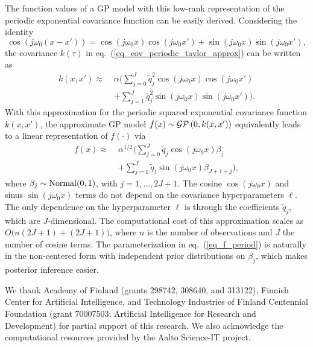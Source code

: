 The function values of a GP model with this low-rank representation of the periodic exponential covariance function can be easily derived. Considering the identity
%
\begin{equation*}
\cos(j\omega_0 (x-x'))=\cos(j\omega_0 x) \cos(j\omega_0 x') + \sin(j\omega_0 x) \sin(j\omega_0 x'),
\end{equation*}
the covariance $k(\tau)$ in eq.~(\ref{eq_cov_periodic_taylor_approx}) can be written as
%
\begin{align} \label{eq_cov_periodic_taylor_approx_2}
k(x,x')\approx \; & \alpha \bigg( \sum_{j=0}^{J} \tilde{q}_j^2 \cos(j\omega_0 x)  \cos(j\omega_0 x')  \nonumber\\
& + \sum_{j=1}^{J} \tilde{q}_j^2 \sin(j\omega_0 x) \sin(j\omega_0 x') \bigg).
\end{align}
With this approximation for the periodic squared exponential covariance function $k(x,x')$, the approximate GP model $f(x) \sim \operatorname{\mathcal{GP}}\left(0,k(x,x')\right)$ equivalently leads to a linear representation of $f(\cdot)$ via
%
\begin{align} \label{eq_f_period}
f(x) \approx \; & \alpha^{1/2} \bigg( \sum_{j=0}^J  \tilde{q}_j \cos(j\omega_0 x) \beta_j \nonumber\\
& +  \sum_{j=1}^J \tilde{q}_j \sin(j\omega_0 x) \beta_{J+1+j} \bigg),
\end{align}
where $\beta_j \sim \operatorname{Normal}(0,1)$, with $j=1,\dots,2J+1$. The cosine $\cos(j\omega_0 x)$ and sinus $\sin(j\omega_0 x)$ terms do not depend on the covariance hyperparameters $\ell$. The only dependence on the hyperparameter $\ell$ is through the coefficients $\tilde{q}_j$, which are $J$-dimensional. The computational cost of this approximation scales as $O\big(n(2J+1) + (2J+1)\big)$, where $n$ is the number of observations and $J$ the number of cosine terms.
The parameterization in eq.~(\ref{eq_f_period}) is naturally in the non-centered form with independent prior distributions on
$\beta_j$, which makes posterior inference easier.




\begin{acknowledgements}
We thank Academy of Finland (grants 298742, 308640, and 313122), Finnish Center for Artificial Intelligence, and Technology Industries of Finland Centennial Foundation (grant 70007503; Artificial Intelligence for Research and Development) for partial support of this research. We also acknowledge the computational resources provided by the Aalto Science-IT project.
\end{acknowledgements}



